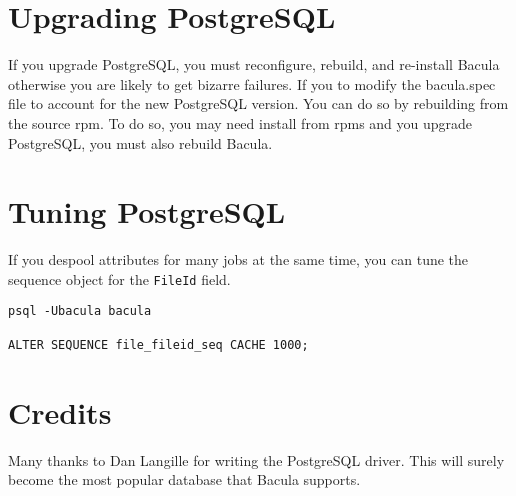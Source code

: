 \section{Upgrading PostgreSQL}
If you upgrade PostgreSQL, you must reconfigure, rebuild, and re-install 
Bacula otherwise you are likely to get bizarre failures.  If you
to modify the bacula.spec file to account for the new PostgreSQL version.
You can do so by rebuilding from the source rpm. To do so, you may need
install from rpms and you upgrade PostgreSQL, you must also rebuild Bacula.

\section{Tuning PostgreSQL}

If you despool attributes for many jobs at the same time, you can tune the
sequence object for the \texttt{FileId} field.
\begin{verbatim}
psql -Ubacula bacula

ALTER SEQUENCE file_fileid_seq CACHE 1000;
\end{verbatim}

\section{Credits}
Many thanks to Dan Langille for writing the PostgreSQL driver. This will
surely become the most popular database that Bacula supports. 
